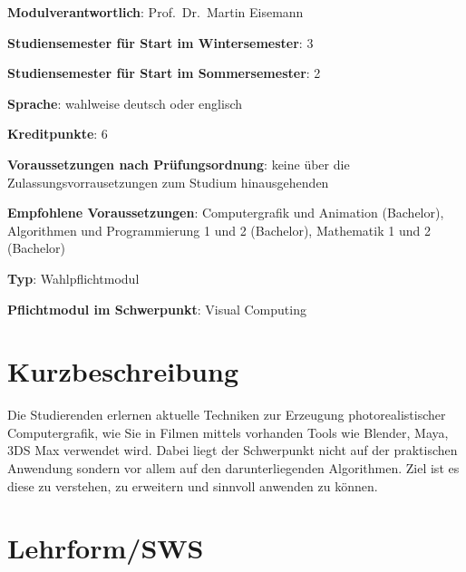 \begin{modulHead}
\textbf{Modulverantwortlich}: Prof.~Dr.~Martin
Eisemann
\end{modulHead}
\begin{modulHead}
\textbf{Studiensemester für
Start im Wintersemester}:
3
\end{modulHead}
\begin{modulHead}
\textbf{Studiensemester für Start
im Sommersemester}:
2
\end{modulHead}
\begin{modulHead}
\textbf{Sprache}: wahlweise deutsch
oder englisch
\end{modulHead}
\begin{modulHead}
\textbf{Kreditpunkte}:
6
\end{modulHead}
\begin{modulHead}
\textbf{Voraussetzungen nach
Prüfungsordnung}: keine über die Zulassungsvorrausetzungen zum Studium
hinausgehenden
\end{modulHead}
\begin{modulHead}
\textbf{Empfohlene
Voraussetzungen}: Computergrafik und Animation (Bachelor), Algorithmen
und Programmierung 1 und 2 (Bachelor), Mathematik 1 und 2
(Bachelor)
\end{modulHead}
\begin{modulHead}
\textbf{Typ}:
Wahlpflichtmodul
\end{modulHead}
\begin{modulHead}
\textbf{Pflichtmodul
im Schwerpunkt}: Visual Computing
\end{modulHead}


\section*{Kurzbeschreibung\label{/mi-2017/modulbeschreibungen-master/MA_VC_Modul_PhotorealistischeBildsynthese}}\label{kurzbeschreibungpathlabelmi-2017modulbeschreibungen-mastermaux5fvcux5fmodulux5fphotorealistischebildsynthese}

Die Studierenden erlernen aktuelle Techniken zur Erzeugung
photorealistischer Computergrafik, wie Sie in Filmen mittels vorhanden
Tools wie Blender, Maya, 3DS Max verwendet wird. Dabei liegt der
Schwerpunkt nicht auf der praktischen Anwendung sondern vor allem auf
den darunterliegenden Algorithmen. Ziel ist es diese zu verstehen, zu
erweitern und sinnvoll anwenden zu können.

\section*{Lehrform/SWS\label{/mi-2017/modulbeschreibungen-master/MA_VC_Modul_PhotorealistischeBildsynthese}}\label{lehrformswspathlabelmi-2017modulbeschreibungen-mastermaux5fvcux5fmodulux5fphotorealistischebildsynthese}


